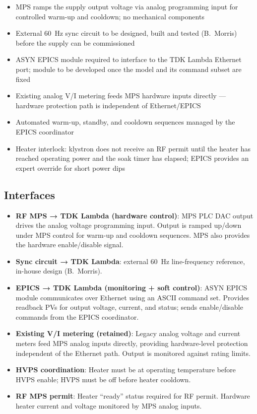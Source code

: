 \begin{itemize}
\tightlist
\item
  MPS ramps the supply output voltage via analog programming input for controlled warm-up and cooldown; no mechanical components
\item
  External \qty{60}{\hertz} sync circuit to be designed, built and tested (B.~Morris) before the supply can be commissioned
\item
  ASYN EPICS module required to interface to the TDK Lambda Ethernet port; module to be developed once the model and its command subset are fixed
\item
  Existing analog V/I metering feeds MPS hardware inputs directly --- hardware protection path is independent of Ethernet/EPICS
\item
  Automated warm-up, standby, and cooldown sequences managed by the EPICS coordinator
\item
  Heater interlock: klystron does not receive an RF permit until the heater has reached operating power and the soak timer has elapsed; EPICS provides an expert override for short power dips
\end{itemize}

\subsection{Interfaces}\label{interfaces-3}

\begin{itemize}
\tightlist
\item
  \textbf{RF MPS → TDK Lambda (hardware control)}: MPS PLC DAC output drives the analog voltage programming input. Output is ramped up/down under MPS control for warm-up and cooldown sequences. MPS also provides the hardware enable/disable signal.
\item
  \textbf{Sync circuit → TDK Lambda}: external \qty{60}{\hertz} line-frequency reference, in-house design (B.~Morris).
\item
  \textbf{EPICS → TDK Lambda (monitoring + soft control)}: ASYN EPICS module communicates over Ethernet using an ASCII command set. Provides readback PVs for output voltage, current, and status; sends enable/disable commands from the EPICS coordinator.
\item
  \textbf{Existing V/I metering (retained)}: Legacy analog voltage and current meters feed MPS analog inputs directly, providing hardware-level protection independent of the Ethernet path. Output is monitored against rating limits.
\item
  \textbf{HVPS coordination}: Heater must be at operating temperature before HVPS enable; HVPS must be off before heater cooldown.
\item
  \textbf{RF MPS permit}: Heater ``ready'' status required for RF permit. Hardware heater current and voltage monitored by MPS analog inputs.
\end{itemize}

